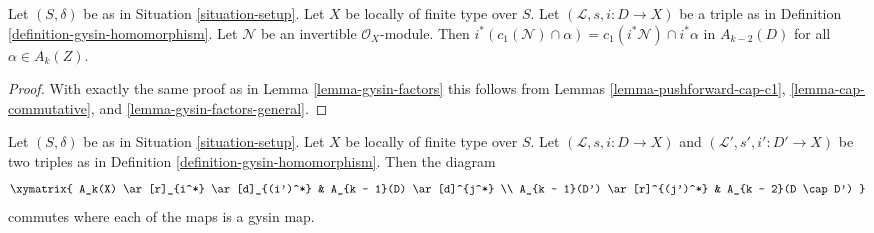 \begin{lemma}
\label{lemma-gysin-commutes-cap-c1}
Let $(S, \delta)$ be as in Situation \ref{situation-setup}. Let $X$ be
locally of finite type over $S$. Let $(\mathcal{L}, s, i : D \to X)$
be a triple as in Definition \ref{definition-gysin-homomorphism}.
Let $\mathcal{N}$ be an invertible $\mathcal{O}_X$-module.
Then $i^*(c_1(\mathcal{N}) \cap \alpha) = c_1(i^*\mathcal{N}) \cap i^*\alpha$
in $A_{k - 2}(D)$ for all $\alpha \in A_k(Z)$.
\end{lemma}

\begin{proof}
With exactly the same proof as in Lemma \ref{lemma-gysin-factors}
this follows from Lemmas
\ref{lemma-pushforward-cap-c1},
\ref{lemma-cap-commutative}, and
\ref{lemma-gysin-factors-general}.
\end{proof}

\begin{lemma}
\label{lemma-gysin-commutes-gysin}
Let $(S, \delta)$ be as in Situation \ref{situation-setup}. Let $X$ be locally
of finite type over $S$. Let $(\mathcal{L}, s, i : D \to X)$ and
$(\mathcal{L}', s', i' : D' \to X)$ be two triples as in
Definition \ref{definition-gysin-homomorphism}. Then the diagram
$$
\xymatrix{
A_k(X) \ar[r]_{i^*} \ar[d]_{(i')^*} & A_{k - 1}(D) \ar[d]^{j^*} \\
A_{k - 1}(D') \ar[r]^{(j')^*} & A_{k - 2}(D \cap D')
}
$$
commutes where each of the maps is a gysin map.
\end{lemma}

